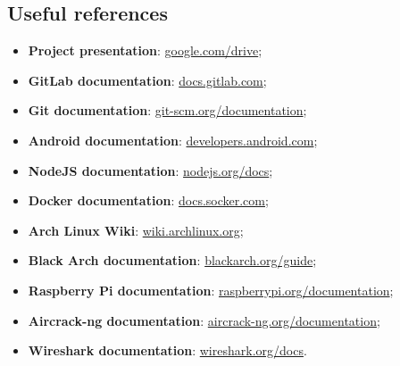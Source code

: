 \documentclass[../PiTest.tex]{subfiles}
\begin{document}
	\subsection{Useful references}
		\begin{itemize}
			\item\textbf{Project presentation}: \url{google.com/drive}; %
			\item\textbf{GitLab documentation}: \url{docs.gitlab.com};
			\item\textbf{Git documentation}: \url{git-scm.org/documentation};
			\item\textbf{Android documentation}: \url{developers.android.com};
			\item\textbf{NodeJS documentation}: \url{nodejs.org/docs};
			\item\textbf{Docker documentation}: \url{docs.socker.com};
			\item\textbf{Arch Linux Wiki}: \url{wiki.archlinux.org};
			\item\textbf{Black Arch documentation}: \url{blackarch.org/guide};
			\item\textbf{Raspberry Pi documentation}: \url{raspberrypi.org/documentation};
			\item\textbf{Aircrack-ng documentation}: \url{aircrack-ng.org/documentation};
			\item\textbf{Wireshark documentation}: \url{wireshark.org/docs}.
		\end{itemize}
			
\end{document}
